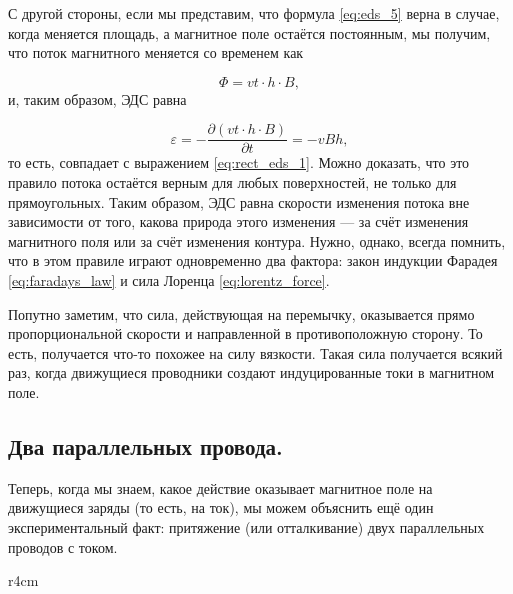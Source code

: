 \documentclass[a4paper,12pt]{article}
\newcommand{\pt}{\partial}
\newcommand{\vareps}{\varepsilon}
\begin{document}
С другой стороны, если мы представим, что формула \eqref{eq:eds_5}
верна в случае, когда меняется площадь, а магнитное поле остаётся
постоянным, мы получим, что поток магнитного меняется со временем как 

\begin{equation}
  \label{eq:rect_eds_2}
  \Phi = vt\cdot h \cdot B,
\end{equation}
и, таким образом, ЭДС равна 

\begin{equation}
  \label{eq:rect_eds_3}
  \vareps = -\frac{\pt \left( vt \cdot h \cdot B \right)}{\pt t} = - v B h,
\end{equation}
то есть, совпадает с выражением \eqref{eq:rect_eds_1}. Можно доказать,
что это правило потока остаётся верным для любых поверхностей, не
только для прямоугольных. Таким образом, ЭДС равна скорости изменения
потока вне зависимости от того, какова природа этого изменения --- за
счёт изменения магнитного поля или за счёт изменения контура. Нужно,
однако, всегда помнить, что в этом правиле играют одновременно два
фактора: закон индукции Фарадея \eqref{eq:faradays_law} и сила Лоренца
\eqref{eq:lorentz_force}.

Попутно заметим, что сила, действующая на перемычку, оказывается прямо
пропорциональной скорости и направленной в противоположную сторону. То
есть, получается что-то похожее на силу вязкости. Такая сила
получается всякий раз, когда движущиеся проводники создают
индуцированные токи в магнитном поле.

\clearpage

\subsection{Два параллельных провода.}
\label{sec:two_parallel_lines}

Теперь, когда мы знаем, какое действие оказывает магнитное поле на
движущиеся заряды (то есть, на ток), мы можем объяснить ещё один
экспериментальный факт: притяжение (или отталкивание) двух
параллельных проводов с током.

\begin{wrapfigure}{r}{4cm}
\centering
{}
\label{fig:current_wire_ampere}
\end{wrapfigure}
\end{document}
